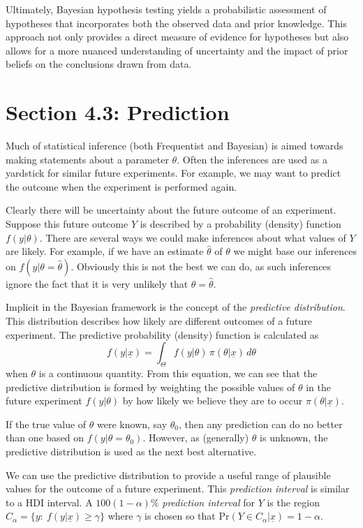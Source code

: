 Ultimately, Bayesian hypothesis testing yields a probabilistic assessment of hypotheses that incorporates both the observed data and prior knowledge. This approach not only provides a direct measure of evidence for hypotheses but also allows for a more nuanced understanding of uncertainty and the impact of prior beliefs on the conclusions drawn from data.




\section{Section 4.3: Prediction}
Much of statistical inference (both Frequentist and Bayesian) is aimed towards making statements about a parameter $\theta$. Often the inferences are used as a yardstick for similar future experiments. For example, we may want to predict the outcome when the experiment is performed again.

Clearly there will be uncertainty about the future outcome of an experiment. Suppose this future outcome $Y$ is described by a probability (density) function $f(y|\theta)$. There are several ways we could make inferences about what values of $Y$ are likely. For example, if we have an estimate $\hat{\theta}$ of $\theta$ we might base our inferences on $f(y|\theta=\hat{\theta})$. Obviously this is not the best we can do, as such inferences ignore the fact that it is very unlikely that $\theta=\hat{\theta}$. 

Implicit in the Bayesian framework is the concept of the {\it predictive distribution}. This distribution describes how likely are different outcomes of a future experiment. The predictive probability (density) function is calculated as
\begin{equation*}
f(y|\underline{x})=\int_\Theta
f(y|\theta)\,\pi(\theta|\underline{x})\,d\theta
\end{equation*}
when $\theta$ is a continuous quantity. From this equation, we can see that the predictive distribution is formed by weighting the possible values of $\theta$ in the future experiment $f(y|\theta)$ by how likely we believe they are to occur $\pi(\theta|\underline{x})$.

If the true value of $\theta$ were known, say $\theta_0$, then any prediction can do no better than one based on $f(y|\theta=\theta_0)$. However, as (generally) $\theta$ is unknown, the predictive distribution is used as the next best alternative.

We can use the predictive distribution to provide a useful range of plausible values for the outcome of a future experiment. This \emph{prediction interval} is similar to a HDI interval. A $100(1-\alpha)\%$ \emph{prediction interval} for $Y$ is the region $C_\alpha=\{y:~f(y|\underline{x})\geq\gamma\}$ where $\gamma$ is chosen so that $\text{Pr}(Y\in C_\alpha|\underline{x})=1-\alpha$.

